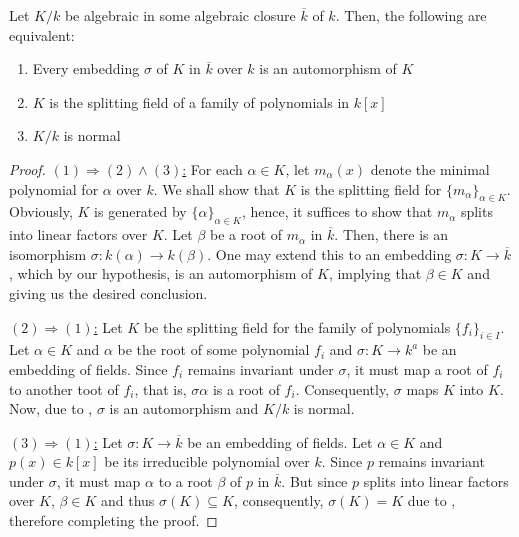 \begin{theorem}
    Let $K/k$ be algebraic in some algebraic closure $\overline{k}$ of $k$. Then, the following are equivalent: 
    \begin{enumerate}
        \item Every embedding $\sigma$ of $K$ in $\overline{k}$ over $k$ is an automorphism of $K$ 
        \item $K$ is the splitting field of a family of polynomials in $k[x]$
        \item $K/k$ is normal
    \end{enumerate}
\end{theorem}
\begin{proof}
\hfill 

\noindent\underline{$(1)\Longrightarrow(2)\wedge(3)$:} For each $\alpha\in K$, let $m_\alpha(x)$ denote the minimal polynomial for $\alpha$ over $k$. We shall show that $K$ is the splitting field for $\{m_\alpha\}_{\alpha\in K}$. Obviously, $K$ is generated by $\{\alpha\}_{\alpha\in K}$, hence, it suffices to show that $m_\alpha$ splits into linear factors over $K$. Let $\beta$ be a root of $m_\alpha$ in $\overline{k}$. Then, there is an isomorphism $\sigma: k(\alpha)\to k(\beta)$. One may extend this to an embedding $\sigma: K\to\overline{k}$, which by our hypothesis, is an automorphism of $K$, implying that $\beta\in K$ and giving us the desired conclusion.

\noindent\underline{$(2)\Longrightarrow(1)$:} Let $K$ be the splitting field for the family of polynomials $\{f_i\}_{i\in I}$. Let $\alpha\in K$ and $\alpha$ be the root of some polynomial $f_i$ and $\sigma: K\to k^a$ be an embedding of fields. Since $f_i$ remains invariant under $\sigma$, it must map a root of $f_i$ to another toot of $f_i$, that is, $\sigma\alpha$ is a root of $f_i$. Consequently, $\sigma$ maps $K$ into $K$. Now, due to , $\sigma$ is an automorphism and $K/k$ is normal.

\noindent\underline{$(3)\Longrightarrow(1)$:} Let $\sigma: K\to\overline{k}$ be an embedding of fields. Let $\alpha\in K$ and $p(x)\in k[x]$ be its irreducible polynomial over $k$. Since $p$ remains invariant under $\sigma$, it must map $\alpha$ to a root $\beta$ of $p$ in $\overline{k}$. But since $p$ splits into linear factors over $K$, $\beta\in K$ and thus $\sigma(K)\subseteq K$, consequently, $\sigma(K) = K$ due to , therefore completing the proof.
\end{proof}


